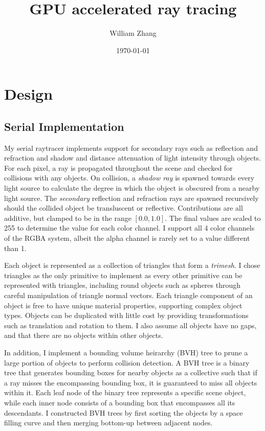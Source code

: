 \documentclass[11pt]{article}
\title{GPU accelerated ray tracing}
\author{William Zhang}
\date{\today}
\begin{document}
\maketitle
\section{Design}
\subsection{Serial Implementation}
My serial raytracer implements support for secondary rays such as reflection and refraction and
shadow and distance attenuation of light intensity through objects. For each pixel, a ray is propagated
throughout the scene and checked for collisions with any objects. On collision, a \textit{shadow ray} is 
spawned towards every light source to calculate the degree in which the object is obscured from a nearby
light source. The \textit{secondary} reflection and refraction rays are spawned recursively should the collided object be 
transluscent or reflective. Contributions are all additive, but clamped to be in the range $[0.0, 1.0]$.
The final values are scaled to 255 to determine the value for each color channel. I support all 4 color
channels of the RGBA system, albeit the alpha channel is rarely set to a value different than 1.

Each object is represented as a collection of triangles that form a \textit{trimesh}. I chose triangles as the only
primitive to implement as every other primitive can be represented with triangles, including round objects such
as spheres through careful manipulation of triangle normal vectors. Each triangle component of an object is free
to have unique material properties, supporting complex object types. Objects can be duplicated with little cost by 
providing transformations such as translation and rotation to them. I also assume all objects have no gaps, and that
there are no objects within other objects.

In addition, I implement a bounding volume heirarchy (BVH) tree to prune a large portion of objects to perform collision
detection. A BVH tree is a binary tree that generates bounding boxes for nearby objects as a collective such that
if a ray misses the encompassing bounding box, it is guaranteed to miss all objects within it. Each leaf node of
the binary tree represents a specific scene object, while each inner node consists of a bounding box that encompasses
all its descendants. I constructed BVH trees by first sorting the objects by a space filling curve and then 
merging bottom-up between adjacent nodes.
\end{document}
